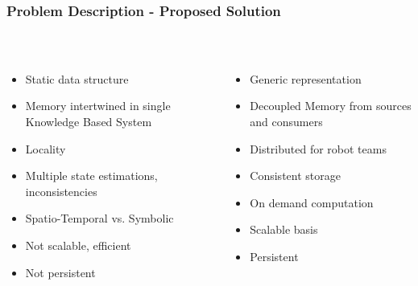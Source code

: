 \begin{frame}
  \frametitle{Problem Description - Proposed Solution}
  \begin{columns}
    \begin{column}{0.58\textwidth}
  \begin{description}[]
  \item[Problems of existing approaches] \hfill \\
    \begin{itemize}
        \item Static data structure
        \item Memory intertwined in single Knowledge Based System
        \item Locality
        \item Multiple state estimations, inconsistencies
        \item Spatio-Temporal vs. Symbolic
        \item Not scalable, efficient
        \item Not persistent
    \end{itemize}
  \end{description}
    \end{column}
    \begin{column}{0.48\textwidth}
  \begin{description}[]
  \item[Proposed Robot Memory] \hfill \\
    \begin{itemize}
        \item Generic representation 
        \item Decoupled Memory from sources and consumers
        \item Distributed for robot teams
        \item Consistent storage\\\hfill
        \item On demand computation
        \item Scalable basis
        \item Persistent
    \end{itemize}
  \end{description}
    \end{column}
  \end{columns}
\end{frame}

